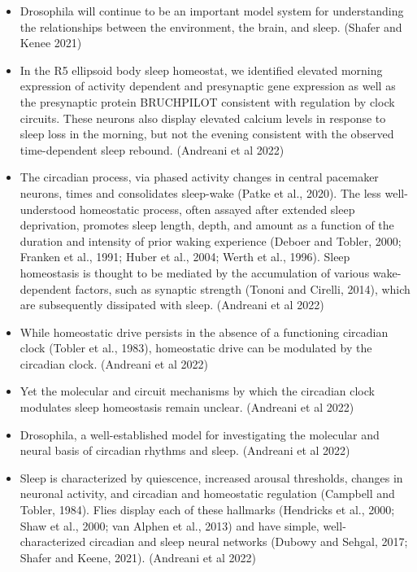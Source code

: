 \documentclass[11pt]{article}
\begin{document}
\begin{itemize}
    \item Drosophila will continue to be an important model system for understanding the relationships between the environment, the brain, and sleep.
    \cite{shaferRegulationDrosophilaSleep2021} (Shafer and Kenee 2021)

    \item In the R5 ellipsoid body sleep homeostat, we identified elevated morning expression of activity dependent
    and presynaptic gene expression as well as the presynaptic protein BRUCHPILOT consistent with regulation by clock
    circuits. These neurons also display elevated calcium levels in response to sleep loss in the morning, but not the
    evening consistent with the observed time-dependent sleep rebound.
    \cite{andreaniCircadianProgrammingEllipsoid2022} (Andreani et al 2022)

    \item The circadian process, via phased activity changes in central pacemaker neurons, times and consolidates sleep-wake (Patke et al., 2020). The less well-understood homeostatic process, often assayed after extended sleep deprivation, promotes sleep length, depth, and amount as a function of the duration and intensity of prior waking experience (Deboer and Tobler, 2000; Franken et al., 1991; Huber et al., 2004; Werth et al., 1996). Sleep homeostasis is thought to be mediated by the accumulation of various wake-dependent factors, such as synaptic strength (Tononi and Cirelli, 2014), which are subsequently dissipated with sleep.
    \cite{andreaniCircadianProgrammingEllipsoid2022} (Andreani et al 2022)

    \item While homeostatic drive persists in the absence of a functioning circadian clock (Tobler et al., 1983), homeostatic drive can be modulated by the circadian clock.
    \cite{andreaniCircadianProgrammingEllipsoid2022} (Andreani et al 2022)

    \item Yet the molecular and circuit mechanisms by which the circadian clock modulates sleep homeostasis remain unclear.
    \cite{andreaniCircadianProgrammingEllipsoid2022} (Andreani et al 2022)

    \item Drosophila, a well-established model for investigating the molecular and neural basis of circadian rhythms and sleep.
    \cite{andreaniCircadianProgrammingEllipsoid2022} (Andreani et al 2022)

    \item Sleep is characterized by quiescence, increased arousal thresholds, changes in neuronal activity, and circadian and homeostatic regulation (Campbell and Tobler, 1984). Flies display each of these hallmarks (Hendricks et al., 2000; Shaw et al., 2000; van Alphen et al., 2013) and have simple, well-characterized circadian and sleep neural networks (Dubowy and Sehgal, 2017; Shafer and Keene, 2021).
    \cite{andreaniCircadianProgrammingEllipsoid2022} (Andreani et al 2022)


\end{itemize}
\end{document}
